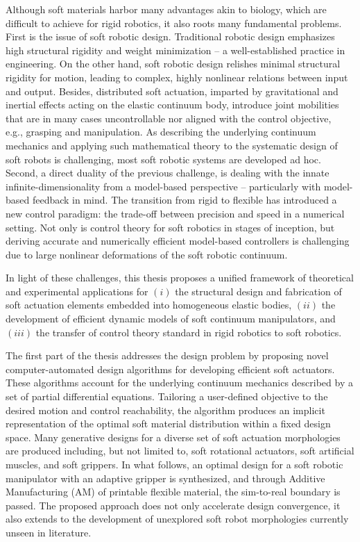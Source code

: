 Although soft materials harbor many advantages akin to biology, which are difficult to achieve for rigid robotics, it also roots many fundamental problems. First is the issue of soft robotic design. Traditional robotic design emphasizes high structural rigidity and weight minimization -- a well-established practice in engineering. On the other hand, soft robotic design relishes minimal structural rigidity for motion, leading to complex, highly nonlinear relations between input and output. Besides, distributed soft actuation, imparted by gravitational and inertial effects acting on the elastic continuum body, introduce joint mobilities that are in many cases uncontrollable nor aligned with the control objective, \, e.g., grasping and manipulation. As describing the underlying continuum mechanics and applying such mathematical theory to the systematic design of soft robots is challenging, most soft robotic systems are developed ad hoc. Second, a direct duality of the previous challenge, is dealing with the innate infinite-dimensionality from a model-based perspective -- particularly with model-based feedback in mind. The transition from rigid to flexible has introduced a new control paradigm: the trade-off between precision and speed in a numerical setting. Not only is control theory for soft robotics in stages of inception, but deriving accurate and numerically efficient model-based controllers is challenging due to large nonlinear deformations of the soft robotic continuum.

In light of these challenges, this thesis proposes a unified framework of theoretical and experimental applications for $(i)$ the structural design and fabrication of soft actuation elements embedded into homogeneous elastic bodies, $(ii)$ the development of efficient dynamic models of soft continuum manipulators, and $(iii)$ the transfer of control theory standard in rigid robotics to soft robotics.

The first part of the thesis addresses the design problem by proposing novel computer-automated design algorithms for developing efficient soft actuators. These algorithms account for the underlying continuum mechanics described by a set of partial differential equations. Tailoring a user-defined objective to the desired motion and control reachability, the algorithm produces an implicit representation of the optimal soft material distribution within a fixed design space. Many generative designs for a diverse set of soft actuation morphologies are produced including, but not limited to, soft rotational actuators, soft artificial muscles, and soft grippers. In what follows, an optimal design for a soft robotic manipulator with an adaptive gripper is synthesized, and through Additive Manufacturing (AM) of printable flexible material, the sim-to-real boundary is passed. The proposed approach does not only accelerate design convergence, it also extends to the development of unexplored soft robot morphologies currently unseen in literature.

